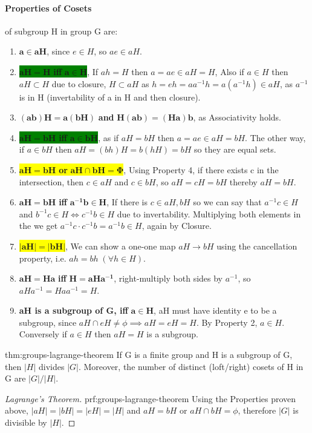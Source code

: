 \paragraph{Properties of Cosets} of subgroup H in group G are:
\begin{enumerate}
    \item $\mathbf{a \in aH}$, since $e \in H$, so $ae \in aH$.
    \item \colorbox{green}{$\mathbf{aH = H}$ \textbf{iff} $\mathbf{a \in H}$}, If $ah = H$ then $a = ae \in aH = H$, Also if $a \in H$ then $aH \subset H$ due to closure, $H \subset aH$ as $h = eh = aa^{-1}h = a(a^{-1}h) \in aH$, as $a^{-1}$ is in H (invertability of a in H and then closure).
    \item $\mathbf{(ab)H = a(bH)}$ \textbf{and} $\mathbf{H(ab) = (Ha)b}$, as Associativity holds.
    \item \colorbox{green}{$\mathbf{aH = bH}$ \textbf{iff} $\mathbf{a \in bH}$}, as if $aH = bH$ then $a = ae \in aH = bH$. The other way, if $a \in bH$ then $aH = (bh)H = b(hH) = bH$ so they are equal sets.
    \item \colorbox{yellow}{$\mathbf{aH = bH}$ \textbf{or} $\mathbf{aH \cap bH = \Phi}$}, Using Property 4, if there exists c in the intersection, then $c \in aH$ and $c \in bH$, so $aH = cH = bH$ thereby $aH = bH$.
    \item $\mathbf{aH = bH}$ \textbf{iff} $\mathbf{a^{-1}b \in H}$, If there is $c \in aH,bH$ so we can say that $a^{-1}c \in H$ and $b^{-1}c \in H \iff c^{-1}b \in H$ due to invertability. Multiplying both elements in the we get $a^{-1}c \cdot c^{-1}b = a^{-1}b \in H$, again by Closure.
    \item \colorbox{yellow}{$\mathbf{|aH| = |bH|}$}, We can show a one-one map $aH \rightarrow bH$ using the cancellation property, i.e. $ah = bh \; (\forall h \in H)$.
    \item $\mathbf{aH = Ha}$ \textbf{iff} $\mathbf{H = aHa^{-1}}$, right-multiply both sides by $a^{-1}$, so $aHa^{-1} = Haa^{-1} = H$.
    \item \textbf{aH is a subgroup of G, iff} $\mathbf{a \in H}$, aH must have identity e to be a subgroup, since $aH \cap eH \neq \phi \implies aH = eH = H$. By Property 2, $a \in H$. Conversely if $a \in H$ then $aH = H$ is a subgroup.
\end{enumerate}

\begin{theorem}{thm:groups-lagrange-theorem}
    If G is a finite group and H is a subgroup of G, then $|H|$ divides $|G|$. Moreover, the number of distinct (loft/right) cosets of H in G are $|G|/|H|$.
\end{theorem}
\begin{proof}[Lagrange's Theorem]{prf:groups-lagrange-theorem}
    Using the Properties proven above, $|aH| = |bH| = |eH| = |H|$ and $aH = bH$ or $aH \cap bH = \phi$, therefore $|G|$ is divisible by $|H|$.
\end{proof}

